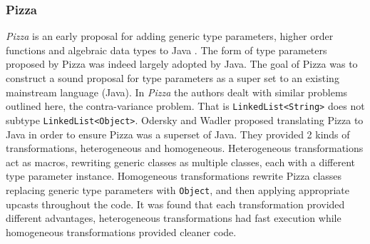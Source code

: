 \documentclass[11pt
              , a4paper
              , twoside
              , openright
              ]{report}
\numberwithin{case}{theorem}
\numberwithin{subcase}{case}
\begin{document}
\subsubsection{Pizza}

\emph{Pizza} is an early proposal for adding generic type parameters, higher order functions and algebraic data types to Java \cite{Odersky:1997:PJT:263699.263715}. The form of type parameters proposed by Pizza was indeed largely adopted by Java. The goal of Pizza was to construct a sound proposal for type parameters as a super set to an existing mainstream language (Java). In \emph{Pizza} the authors dealt with similar problems outlined here, the contra-variance problem. That is \verb|LinkedList<String>| does not subtype \verb|LinkedList<Object>|. Odersky and Wadler \cite{Odersky:1997:PJT:263699.263715} proposed translating Pizza to Java in order to ensure Pizza was a superset of Java. They provided 2 kinds of transformations, heterogeneous and homogeneous. Heterogeneous transformations act as macros, rewriting generic classes as multiple classes, each with a different type parameter instance. Homogeneous transformations rewrite Pizza classes replacing generic type parameters with \verb|Object|, and then applying appropriate upcasts throughout the code. It was found that each transformation provided different advantages, heterogeneous transformations had fast execution while homogeneous transformations provided cleaner code.
\end{document}
